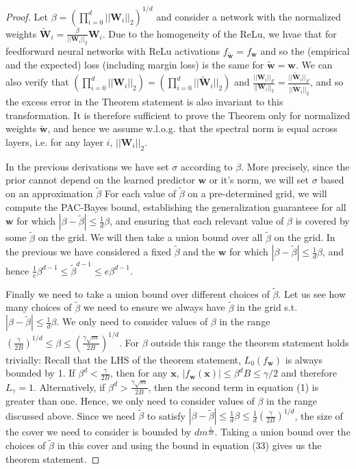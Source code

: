 \documentclass{article} %
\theoremstyle{definition}
\begin{document}
\begin{proof}
Let $\beta = (\prod_{i=0}^d||\boldsymbol{W}_i||_2)^{1/d}$ and consider a network with the normalized weights $\tilde{\boldsymbol{W}}_i = \frac{\beta}{||\boldsymbol{W}_i||_2}\boldsymbol{W}_i$. Due to the homogeneity of the ReLu, we hvae that for feedforward neural networks with ReLu activations $f_{\tilde{\boldsymbol{w}}}=f_{\boldsymbol{w}}$ and so the (empirical and the expected) loss (including margin loss) is the same for $\tilde{\boldsymbol{w}} = \boldsymbol{w}$. We can also verify that $(\prod_{i=0}^d||\boldsymbol{W}_i||_2)=(\prod_{i=0}^d||\tilde{\boldsymbol{W}}_i||_2)$ and $\frac{||\boldsymbol{W}_i||_F}{||\boldsymbol{W}_i||_2}=\frac{||\tilde{\boldsymbol{W}}_i||_F}{||\tilde{\boldsymbol{W}}_i||_2}$, and so the excess error in the Theorem statement is also invariant to this transformation. It is therefore sufficient to prove the Theorem only for normalized weights $\tilde{\boldsymbol{w}}$, and hence we assume w.l.o.g. that the spectral norm is equal across layers, i.e. for any layer $i$, $||\boldsymbol{W}_i||_2$.

In the previous derivations we have set $\sigma$ according to $\beta$. More precisely, since the prior cannot depend on the learned predictor $\boldsymbol{w}$ or it's norm, we will set $\sigma$ based on an approximation $\tilde{\beta}$ For each value of $\tilde{\beta}$ on a pre-determined grid, we will compute the PAC-Bayes bound, establishing the generalization guaranteee for all $\boldsymbol{w}$ for which $|\beta-\tilde{\beta}|\leq\frac{1}{d}\beta$, and ensuring that each relevant value of $\beta$ is covered by some $\tilde{\beta}$ on the grid. We will then take a union bound over all $\tilde{\beta}$ on the grid. In the previous we have considered a fixed $\tilde{\beta}$ and the $\boldsymbol{w}$ for which $|\beta-\tilde{\beta}|\leq\frac{1}{d}\beta$, and hence $\frac{1}{e}\beta^{d-1} \leq \tilde{\beta}^{d-1} \leq e \beta^{d-1}$.

Finally we need to take a union bound over different choices of $\tilde{\beta}$. Let us see how many choices of $\tilde{\beta}$ we need to ensure we always have $\tilde{\beta}$ in the grid s.t. $|\beta-\tilde{\beta}|\leq\frac{1}{d}\beta$. We only need to consider values of $\beta$ in the range $(\frac{\gamma}{2B})^{1/d} \leq \beta \leq (\frac{\gamma\sqrt{m}}{2B})^{1/d}$. For $\beta$ outside this range the theorem statement holds trivially: Recall that the LHS of the theorem statement, $L_0(f_{\boldsymbol{w}})$ is always bounded by 1. If $\beta^d < \frac{\gamma}{2B}$, then for any $\boldsymbol{x}$, $|f_{\boldsymbol{w}}(\boldsymbol{x})| \leq \beta^dB \leq \gamma/2$ and therefore $L_{\gamma}=1$. Alternatively, if $\beta^d > \frac{\gamma\sqrt{m}}{2B}$, then the second term in equation (1) is greater than one. Hence, we only need to consider values of $\beta$ in the range discussed above. Since we need $\tilde{\beta}$ to satisfy $|\beta-\tilde{\beta}|\leq\frac{1}{d}\beta \leq \frac{1}{d}(\frac{\gamma}{2B})^{1/d}$, the size of the cover we need to consider is bounded by $dm^{\frac{1}{2d}}$. Taking a union bound over the choices of $\tilde{\beta}$ in this cover and using the bound in equation (33) gives us the theorem statement. 

\end{proof}
\end{document}
